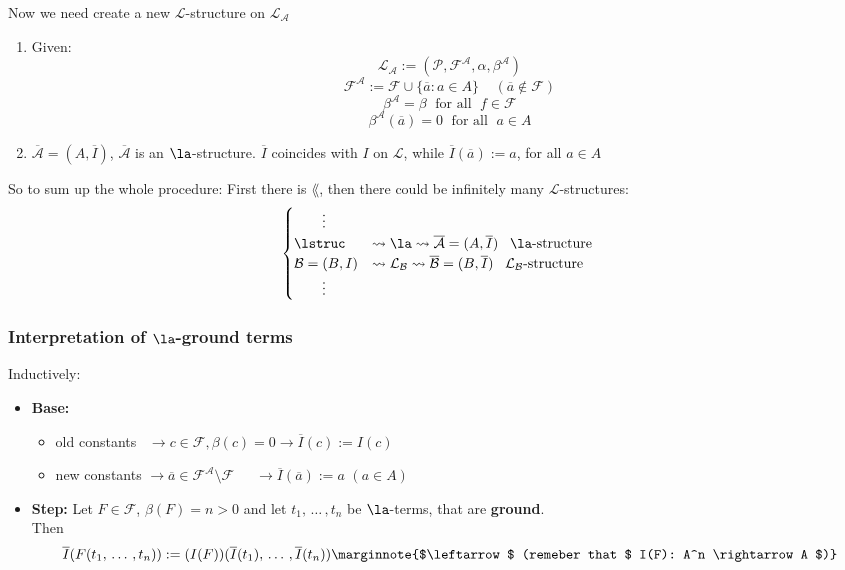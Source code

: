 \noindent
Now we need create a new $\mathcal{L}$-structure on $\mathcal{L}_{\mathcal{A}}$
\begin{enumerate}
	\item Given:
	$$ \mathcal{L}_\mathcal{A} := (\mathcal{P}, \mathcal{F}^\mathcal{A}, \alpha, \beta^\mathcal{A}) $$
	$$ \mathcal{F}^\mathcal{A} := \mathcal{F} \cup \{\overline a: a \in A\} \;\;\;\; (\overline a \notin \mathcal{F}) $$
	$$ \beta^\mathcal{A} = \beta \; \text{ for all } \;  f \in \mathcal{F} $$
	$$ \beta^\mathcal{A}(\overline a) = 0 \; \text{ for all }\; a \in A $$

	\item $\overline{\mathcal{A}} = (A, \overline I)$, $\overline{\mathcal{A}}$ is an $\la$-structure. $\overline I$ coincides with $I$ on $\mathcal{L}$, while $\overline{I} (\overline a) := a$, for all $a \in A$
\end{enumerate}

\noindent
So to sum up the whole procedure:
First there is $\lang$, then there could be infinitely many $\mathcal{L}$-structures:
$$
\begin{cases}
  	\ \ \ \ \ \ \vdots & \\
	\lstruc & \rightsquigarrow \la \rightsquigarrow \overline{\mathcal{A}} = (A, \overline I) \;\;\; \la \text{-structure} \\
	\mathcal{B} = (B, I) & \rightsquigarrow \mathcal{L}_\mathcal{B} \rightsquigarrow \overline{\mathcal{B}} = (B, \overline{I}) \; \; \; \mathcal{L}_\mathcal{B} \text{-structure}\\
	\ \ \ \ \ \ \vdots & \\
\end{cases}
$$

\subsubsection{Interpretation of $\la$-ground terms}

Inductively:
\begin{itemize}
	\item \textbf{Base:}
	\begin{itemize}
		\item old constants \ $\rightarrow c \in \mathcal{F}, \beta(c) = 0 \rightarrow \overline I (c) := I(c)$
		\item new constants $\rightarrow \overline a \in \mathcal{F}^\mathcal{A} \setminus \mathcal{F} \quad \,\,\, \rightarrow \overline I (\overline a) := a$ $(a \in A)$
	\end{itemize} \nn

	\item \textbf{Step:} Let $F \in \mathcal{F}$, $\beta (F) = n > 0$ and let $t_1, \, \dots \, , t_n$ be $\la$-terms, that are \textbf{ground}.\\
	Then
	$$\overline I (F(t_1, \, \dots \, , t_n)) := (I(F))(\overline I (t_1), \, \dots \, , \overline I (t_n)) \marginnote{$\leftarrow$ (remeber that $ I(F): A^n \rightarrow A $)} $$
	
\end{itemize}

